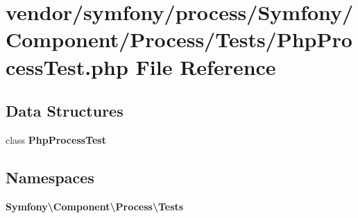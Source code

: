 \section{vendor/symfony/process/\+Symfony/\+Component/\+Process/\+Tests/\+Php\+Process\+Test.php File Reference}
\label{_php_process_test_8php}
\subsection*{Data Structures}
\begin{DoxyCompactItemize}
\item 
class {\bf Php\+Process\+Test}
\end{DoxyCompactItemize}
\subsection*{Namespaces}
\begin{DoxyCompactItemize}
\item 
 {\bf Symfony\textbackslash{}\+Component\textbackslash{}\+Process\textbackslash{}\+Tests}
\end{DoxyCompactItemize}
